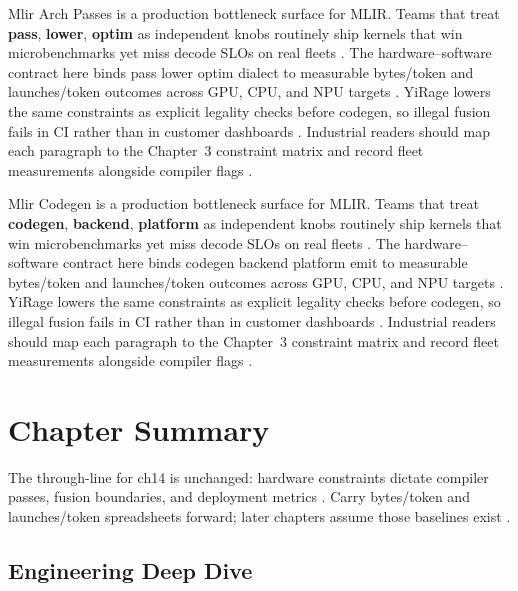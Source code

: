 Mlir Arch Passes is a production bottleneck surface for MLIR. Teams that treat \textbf{pass}, \textbf{lower}, \textbf{optim} as independent knobs routinely ship kernels that win microbenchmarks yet miss decode SLOs on real fleets \citep{nvidia2022hopper,amd2024aie}. The hardware--software contract here binds pass lower optim dialect to measurable bytes/token and launches/token outcomes across GPU, CPU, and NPU targets \citep{semianalysis2024tma,dlbook}. YiRage lowers the same constraints as explicit legality checks before codegen, so illegal fusion fails in CI rather than in customer dashboards \citep{amd2024xdna,dao2022flashattention}. Industrial readers should map each paragraph to the Chapter~3 constraint matrix and record fleet measurements alongside compiler flags \citep{amd2024aie,kwon2023vllm}.

Mlir Codegen is a production bottleneck surface for MLIR. Teams that treat \textbf{codegen}, \textbf{backend}, \textbf{platform} as independent knobs routinely ship kernels that win microbenchmarks yet miss decode SLOs on real fleets \citep{semianalysis2024tma,dlbook}. The hardware--software contract here binds codegen backend platform emit to measurable bytes/token and launches/token outcomes across GPU, CPU, and NPU targets \citep{amd2024xdna,dao2022flashattention}. YiRage lowers the same constraints as explicit legality checks before codegen, so illegal fusion fails in CI rather than in customer dashboards \citep{amd2024aie,kwon2023vllm}. Industrial readers should map each paragraph to the Chapter~3 constraint matrix and record fleet measurements alongside compiler flags \citep{dlbook,nvidia2024cudagraphs}.

\section{Chapter Summary}
\label{sec:ch14_summary}

The through-line for ch14 is unchanged: hardware constraints dictate compiler passes, fusion boundaries, and deployment metrics \citep{memoryfloor2026,amd2024xdna}. Carry bytes/token and launches/token spreadsheets forward; later chapters assume those baselines exist \citep{semianalysis2024tma,dlbook}.


\subsection{Engineering Deep Dive}
\label{sec:ch14_deep_dive}

